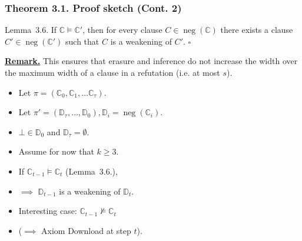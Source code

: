 \documentclass[t,usenames,dvipsnames]{beamer}
\newcommand {\nconf}{\operatorname{neg}}
\begin{document}
\begin{frame}\frametitle{Theorem 3.1. Proof sketch (Cont. 2)}
	\begin{block}{Lemma~3.6.}
		If $\mathbb{C} \models \mathbb{C}'$, then for every clause $C \in
		\nconf(\mathbb{C})$ there exists a clause $C' \in \nconf(\mathbb{C}')$ such that $C$
		is a weakening of $C'$. \hfill $\square$
	\end{block}
	\pause
	\textbf{\underline{Remark.}} This ensures that erasure and inference do not increase the width over the maximum
	width of a clause in a refutation (i.e. at most $s$).
	\pause
	\begin{itemize}[<+->]
		\item Let $\pi = (\mathbb{C}_0, \mathbb{C}_1, \dots \mathbb{C}_{\tau})$.
		\item Let $\pi' = (\mathbb{D}_{\tau}, \dots, \mathbb{D}_0), \mathbb{D}_i =
			\nconf(\mathbb{C}_i)$.
		\item $\bot \in \mathbb{D}_0$ and $\mathbb{D}_{\tau} = \emptyset$.
		\item {\color{red}Assume} for now that $k \geq 3$.
		\item If $\mathbb{C}_{t-1} \models \mathbb{C}_{t}$ (Lemma~3.6.),
		\item[] \hspace{.5cm} $\implies$  $\mathbb{D}_{t-1}$ is a weakening of $\mathbb{D}_t$.
		\item Interesting case: $\mathbb{C}_{t-1} \not \models \mathbb{C}_{t}$
		\item[] \hspace{.5cm} ($\implies$ Axiom Download at step $t$).
	\end{itemize}
\end{frame}
\end{document}

